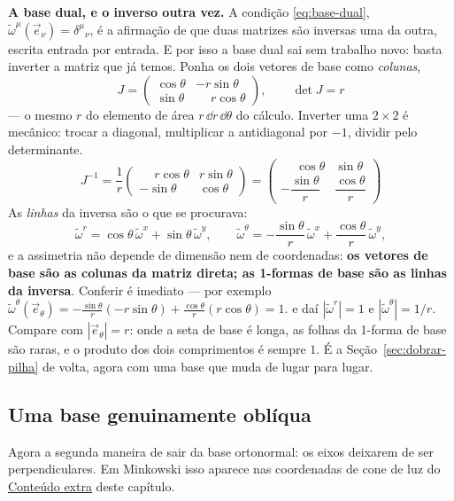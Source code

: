 \documentclass[12pt,a4paper,oneside]{book}
\theoremstyle{rgplain}
\theoremstyle{rgremark}
\begin{document}
\textbf{A base dual, e o inverso outra vez.} A condição
\eqref{eq:base-dual}, $\tilde\omega^\mu(\vec e_\nu)=\delta^\mu{}_\nu$, é a
afirmação de que duas matrizes são inversas uma da outra, escrita entrada por
entrada. E por isso a base dual sai sem trabalho novo: basta inverter a matriz
que já temos. Ponha os dois vetores de base como \emph{colunas},
\[
  J=\begin{pmatrix}\cos\theta & -r\sin\theta\\[2pt]
                   \sin\theta & \phantom{-}r\cos\theta\end{pmatrix},
  \qquad \det J=r
\]
--- o mesmo $r$ do elemento de área $r\,\dd r\,\dd\theta$ do cálculo. Inverter
uma $2\times2$ é mecânico: trocar a diagonal, multiplicar a antidiagonal por
$-1$, dividir pelo determinante.
\[
  J^{-1}=\frac1r\begin{pmatrix}\phantom{-}r\cos\theta & r\sin\theta\\[2pt]
                               -\sin\theta & \cos\theta\end{pmatrix}
        =\begin{pmatrix}\phantom{-}\cos\theta & \sin\theta\\[6pt]
                        -\dfrac{\sin\theta}{r} & \dfrac{\cos\theta}{r}\end{pmatrix}
\]
As \emph{linhas} da inversa são o que se procurava:
\[
  \tilde\omega^r=\cos\theta\,\tilde\omega^x+\sin\theta\,\tilde\omega^y,
  \qquad
  \tilde\omega^\theta=-\frac{\sin\theta}{r}\,\tilde\omega^x
                      +\frac{\cos\theta}{r}\,\tilde\omega^y ,
\]
e a assimetria não depende de dimensão nem de coordenadas:
\textbf{os vetores de base são as colunas da matriz direta; as 1-formas de base
são as linhas da inversa}. Conferir é imediato --- por exemplo
$\tilde\omega^\theta(\vec e_\theta)=-\frac{\sin\theta}{r}(-r\sin\theta)
+\frac{\cos\theta}{r}(r\cos\theta)=1$.
e daí $|\tilde\omega^r|=1$ e $|\tilde\omega^\theta|=1/r$. Compare com
$|\vec e_\theta|=r$: onde a seta de base é longa, as folhas da 1-forma de base
são raras, e o produto dos dois comprimentos é sempre $1$. É a
Seção~\ref{sec:dobrar-pilha} de volta, agora com uma base que muda de lugar
para lugar.

\subsection{Uma base genuinamente oblíqua}
\label{sec:base-obliqua-mesmo}

Agora a segunda maneira de sair da base ortonormal: os eixos deixarem de ser
perpendiculares. Em Minkowski isso aparece nas coordenadas de cone de luz do
\hyperref[sec:extra-tensores]{Conteúdo extra} deste capítulo.
\end{document}
